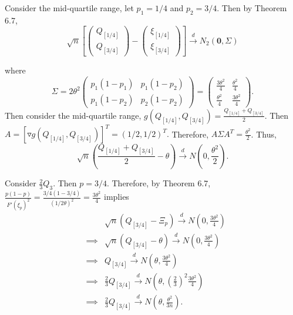 \documentclass[12pt,]{article}
\begin{document}
Consider the mid-quartile range, let \(p_1=1/4\) and \(p_2 = 3/4.\) Then
by Theorem 6.7,
\[\sqrt{n}\left[\begin{pmatrix}Q_{[1/4]} \\ Q_{[3/4]}\end{pmatrix} - \begin{pmatrix} \xi_{[1/4]} \\ \xi_{[3/4]}\end{pmatrix}\right]\overset{d}\rightarrow N_2\left(\boldsymbol 0, \Sigma \right)\]

where
\[\Sigma = 2\theta^2 \begin{pmatrix} p_1(1-p_1) & p_1(1-p_2) \\ p_1(1-p_2) &p_2(1-p_2) \end{pmatrix}= \begin{pmatrix} \frac{3\theta^2}{4} & \frac{\theta^2}{4} \\ \frac{\theta^2}{4} & \frac{3\theta^2}{4}\end{pmatrix}.\]
Then consider the mid-quartile range,
\(g(Q_{[1/4]}, Q_{[3/4]})=\frac{Q_{[1/4]}+ Q_{[3/4]}}{2}\). Then
\(A = [\triangledown g(Q_{[1/4]}, Q_{[3/4]})]^T=(1/2 , 1/2)^T.\)
Therefore, \(A\Sigma A^T = \frac{\theta^2}{2}\). Thus,
\[\sqrt{n}\left(\frac{Q_{[1/4]}+Q_{[3/4]}}{2}-\theta\right)\overset{d}\rightarrow N\left(0, \frac{\theta^2}{2}\right).\]

Consider \(\frac{2}{3}Q_3\). Then \(p = 3/4.\) Therefore, by Theorem
6.7,
\(\frac{p(1-p)}{F'(\xi_p)^2}=\frac{3/4(1-3/4)}{(1/2\theta)^2}=\frac{3\theta^2}{4}\)
implies \begin{align*}
&&\sqrt{n}(Q_{[3/4]} - \Xi_p)\overset{d}\rightarrow N(0,\frac{3\theta^2}{4})\\
&\implies& \sqrt{n}(Q_{[3/4]}-\theta)\overset{d}\rightarrow N(0,\frac{3\theta^2}{4})\\
&\implies& Q_{[3/4]} \overset{d}\rightarrow N(\theta, \frac{3\theta^2}{4})\\
&\implies& \frac{2}{3}Q_{[3/4]} \overset{d}\rightarrow N\left(\theta, \left(\frac{2}{3}\right)^2\frac{3\theta^2}{4}\right)\\
&\implies& \frac{2}{3}Q_{[3/4]} \overset{d}\rightarrow N\left(\theta, \frac{\theta^2}{3n}\right).
\end{align*}
\end{document}
